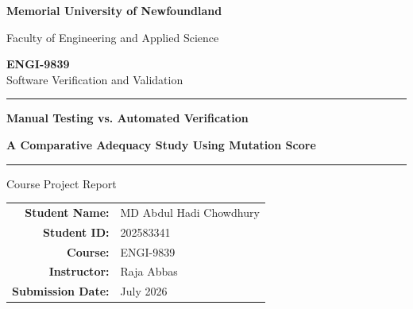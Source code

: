 \documentclass[12pt]{article}
\begin{document}

\begin{titlepage}
    \thispagestyle{empty}

    \begin{center}

        \vspace*{1.2cm}

        {\Large
        \textbf{Memorial University of Newfoundland}
        }

        \vspace{0.3cm}

        {\large
        Faculty of Engineering and Applied Science
        }

        \vspace{1.8cm}

        {\Large
        \textbf{ENGI-9839}\\
        Software Verification and Validation
        }

        \vspace{1.6cm}

        \rule{\textwidth}{0.8pt}

        \vspace{0.6cm}

        {\LARGE
        \textbf{Manual Testing vs. Automated Verification}
        }

        \vspace{0.4cm}

        {\Large
        \textbf{A Comparative Adequacy Study Using Mutation Score}
        }

        \vspace{0.6cm}

        \rule{\textwidth}{0.8pt}

        \vspace{1.8cm}

        {\large
        Course Project Report
        }

        \vfill

        \begin{tabular}{rl}
            \textbf{Student Name:} &
            MD Abdul Hadi Chowdhury \\[0.3cm]

            \textbf{Student ID:} &
            202583341 \\[0.3cm]

            \textbf{Course:} &
            ENGI-9839 \\[0.3cm]

            \textbf{Instructor:} &
            Raja Abbas \\[0.3cm]

            \textbf{Submission Date:} &
            July 2026
        \end{tabular}

        \vfill

    \end{center}
\end{titlepage}
\end{document}

